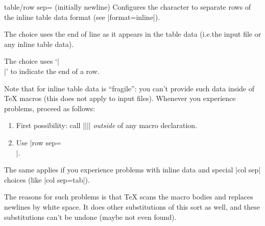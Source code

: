 \documentclass[a4paper]{ltxdoc}
\begin{document}
\begin{pgfplotskey}{table/row sep= (initially newline)}
    Configures the character to separate rows of the inline table data format
    (see |format=inline|).

    The choice  uses the end of line as it appears in the
    table data (i.e.\@ the input file or any inline table data).

    The choice \declaretext{\string\\} uses `|\\|' to indicate the end of a
    row.

    Note that  for inline table data is ``fragile'': you
    can't provide such data inside of \TeX{} macros (this does not apply to
    input files). Whenever you experience problems, proceed as follows:
    \begin{enumerate}
        \item First possibility: call
            |\pgfplotstableread||\yourmacro| \emph{outside} of any
            macro declaration.
        \item Use |row sep=\\|.
    \end{enumerate}
    The same applies if you experience problems with inline data and special
    |col sep| choices (like |col sep=tab|).

    The reasons for such problems is that \TeX{} scans the macro bodies and
    replaces newlines by white space. It does other substitutions of this sort
    as well, and these substitutions can't be undone (maybe not even found).
\end{pgfplotskey}
\end{document}
